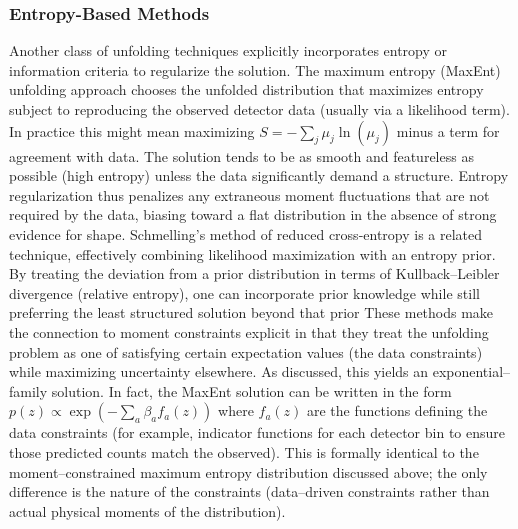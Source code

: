         \subsubsection{Entropy-Based Methods}
            Another class of unfolding techniques explicitly incorporates entropy or information criteria to regularize the solution.
            The maximum entropy (MaxEnt) unfolding approach chooses the unfolded distribution that maximizes entropy subject to reproducing the observed detector data (usually via a likelihood term).
            In practice this might mean maximizing $S = -\sum_j \mu_j \ln(\mu_j)$ minus a term for agreement with data.
            The solution tends to be as smooth and featureless as possible (high entropy) unless the data significantly demand a structure. Entropy regularization thus penalizes any extraneous moment fluctuations that are not required by the data, biasing toward a flat distribution in the absence of strong evidence for shape.
            Schmelling’s method of reduced cross-entropy is a related technique, effectively combining likelihood maximization with an entropy prior.
            By treating the deviation from a prior distribution in terms of Kullback--Leibler divergence (relative entropy), one can incorporate prior knowledge while still preferring the least structured solution beyond that prior
            These methods make the connection to moment constraints explicit in that they treat the unfolding problem as one of satisfying certain expectation values (the data constraints) while maximizing uncertainty elsewhere.
            As discussed, this yields an exponential--family solution.
            In fact, the MaxEnt solution can be written in the form $p(z) \propto \exp(-\sum_a \beta_a f_a(z))$ where $f_a(z)$ are the functions defining the data constraints (for example, indicator functions for each detector bin to ensure those predicted counts match the observed).
            This is formally identical to the moment--constrained maximum entropy distribution discussed above; the only difference is the nature of the constraints (data--driven constraints rather than actual physical moments of the distribution).
